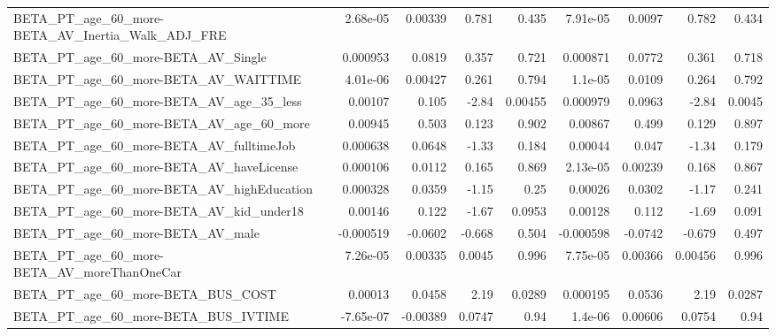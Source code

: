 \begin{tabular}{lrrrrrrrr}
BETA\_PT\_age\_60\_more-BETA\_AV\_Inertia\_Walk\_ADJ\_FRE   &    2.68e-05 &      0.00339 &    0.781 &    0.435 &   7.91e-05 &      0.0097 &        0.782 &         0.434 \\
BETA\_PT\_age\_60\_more-BETA\_AV\_Single                 &    0.000953 &       0.0819 &    0.357 &    0.721 &   0.000871 &      0.0772 &        0.361 &         0.718 \\
BETA\_PT\_age\_60\_more-BETA\_AV\_WAITTIME               &    4.01e-06 &      0.00427 &    0.261 &    0.794 &    1.1e-05 &      0.0109 &        0.264 &         0.792 \\
BETA\_PT\_age\_60\_more-BETA\_AV\_age\_35\_less            &     0.00107 &        0.105 &    -2.84 &  0.00455 &   0.000979 &      0.0963 &        -2.84 &        0.0045 \\
BETA\_PT\_age\_60\_more-BETA\_AV\_age\_60\_more            &     0.00945 &        0.503 &    0.123 &    0.902 &    0.00867 &       0.499 &        0.129 &         0.897 \\
BETA\_PT\_age\_60\_more-BETA\_AV\_fulltimeJob            &    0.000638 &       0.0648 &    -1.33 &    0.184 &    0.00044 &       0.047 &        -1.34 &         0.179 \\
BETA\_PT\_age\_60\_more-BETA\_AV\_haveLicense            &    0.000106 &       0.0112 &    0.165 &    0.869 &   2.13e-05 &     0.00239 &        0.168 &         0.867 \\
BETA\_PT\_age\_60\_more-BETA\_AV\_highEducation          &    0.000328 &       0.0359 &    -1.15 &     0.25 &    0.00026 &      0.0302 &        -1.17 &         0.241 \\
BETA\_PT\_age\_60\_more-BETA\_AV\_kid\_under18            &     0.00146 &        0.122 &    -1.67 &   0.0953 &    0.00128 &       0.112 &        -1.69 &         0.091 \\
BETA\_PT\_age\_60\_more-BETA\_AV\_male                   &   -0.000519 &      -0.0602 &   -0.668 &    0.504 &  -0.000598 &     -0.0742 &       -0.679 &         0.497 \\
BETA\_PT\_age\_60\_more-BETA\_AV\_moreThanOneCar         &    7.26e-05 &      0.00335 &   0.0045 &    0.996 &   7.75e-05 &     0.00366 &      0.00456 &         0.996 \\
BETA\_PT\_age\_60\_more-BETA\_BUS\_COST                  &     0.00013 &       0.0458 &     2.19 &   0.0289 &   0.000195 &      0.0536 &         2.19 &        0.0287 \\
BETA\_PT\_age\_60\_more-BETA\_BUS\_IVTIME                &   -7.65e-07 &     -0.00389 &   0.0747 &     0.94 &    1.4e-06 &     0.00606 &       0.0754 &          0.94 \\

\end{tabular}

